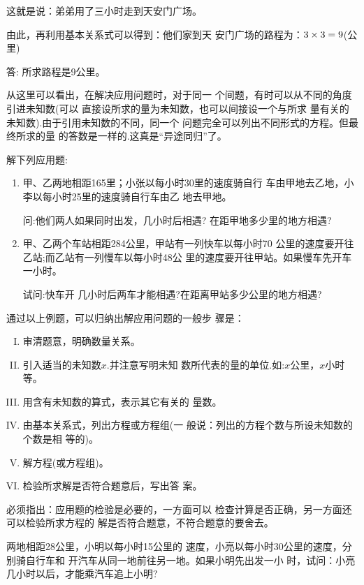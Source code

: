 这就是说：弟弟用了三小时走到天安门广场。

由此，再利用基本关系式可以得到：他们家到天
安门广场的路程为：$3\times3= 9$(公里)
    
答: 所求路程是9公里。

从这里可以看出，在解决应用问题时，对于同一
个间题，有时可以从不同的角度引进未知数(可以
直接设所求的量为未知数，也可以间接设一个与所求
量有关的未知数).由于引用未知数的不同，同一个
问题完全可以列出不同形式的方程。但最终所求的量
的答数是一样的.这真是“异途同归”了。


\begin{ex}
    解下列应用题:
\begin{enumerate}
    \item 甲、乙两地相距165里；小张以每小时30里的速度骑自行
    车由甲地去乙地，小李以每小时25里的速度骑自行车由乙
    地去甲地。
    
    问:他们两人如果同时出发，几小时后相遇?
    在距甲地多少里的地方相遇?
    \item 甲、乙两个车站相距284公里，甲站有一列快车以每小时70
    公里的速度要开往乙站;而乙站有一列慢车以每小时48公
    里的速度要开往甲站。如果慢车先开车一小时。
    
    试问:快车开
    几小时后两车才能相遇?在距离甲站多少公里的地方相遇?
\end{enumerate}
\end{ex}    
    
通过以上例题，可以归纳出解应用问题的一般步
骤是：

\begin{blk}{}
\begin{enumerate}[I. ]
    \item 审清题意，明确数量关系。
    \item 引入适当的未知数$x$.并注意写明未知
    数所代表的量的单位.如:$x$公里，$x$小时等。
    \item 用含有未知数的算式，表示其它有关的
    量数。
    \item 由基本关系式，列出方程或方程组(一
    般说：列出的方程个数与所设未知数的个数是相
    等的)。
    \item 解方程(或方程组)。
    \item 检验所求解是否符合题意后，写出答
    案。
\end{enumerate}
\end{blk}

必须指出：应用题的检验是必要的，一方面可以
检查计算是否正确，另一方面还可以检验所求方程的
解是否符合题意，不符合题意的要舍去。

\begin{example}
    两地相距28公里，小明以每小时15公里的
速度，小亮以每小时30公里的速度，分别骑自行车和
开汽车从同一地前往另一地。如果小明先出发一小
时，试问：小亮几小时以后，才能乘汽车追上小明?
\end{example}


